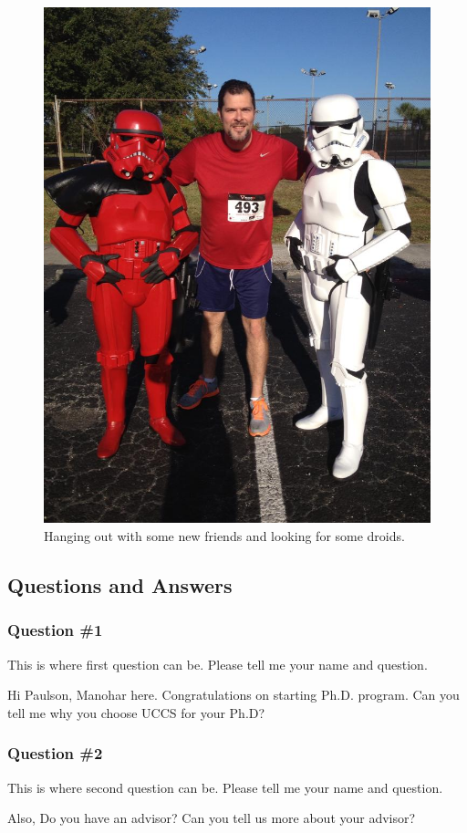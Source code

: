 \begin{figure}
	\centering
	\caption{Hanging out with some new friends and looking for some droids.}
	\label{fig:PaulsonLittleTall}
	\includegraphics[width=0.7\linewidth]{PaulsonLittleTall}
\end{figure}

    \subsection{Questions and Answers}
    \subsubsection {Question \#1}
      This is where first question can be.   Please tell me your name and question.

	Hi Paulson,
		Manohar here. Congratulations on starting Ph.D. program. Can you tell me why you choose UCCS for your Ph.D?

    \subsubsection {Question \#2}
    This is where second question can be.  Please tell me your name and question.  

	Also, Do you have an advisor? Can you tell us more about your advisor?
